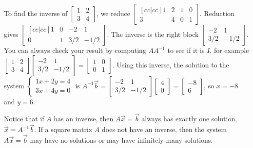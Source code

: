 \begin{example}\label{ex inverse}
To find the inverse of 
$\begin{bmatrix} 1&2\\3&4\end{bmatrix}$,
we reduce 
$\begin{bmatrix}[cc|cc] 1&2&1&0\\3&4&0&1\end{bmatrix}$.  
Reduction gives 
$\begin{bmatrix}[cc|cc] 1&0&-2&1\\0&1&3/2&-1/2
\end{bmatrix}$. 
The inverse is the right block  
$ \begin{bmatrix} -2&1\\3/2&-1/2
\end{bmatrix}$. 
%
You can always check your result by computing $AA^{-1}$ to see if it is $I$, for example
$\begin{bmatrix} 1&2\\ 3&4\end{bmatrix} \begin{bmatrix} -2&1\\3/2&-1/2\end{bmatrix} 
=  \begin{bmatrix} 1&0\\0&1
\end{bmatrix}$. 
Using this inverse, the solution to the system 
$\begin{cases}1x+2y=4\\3x+4y=0\end{cases}$ is $A^{-1}\vec b 
= \begin{bmatrix} -2&1\\3/2&-1/2\end{bmatrix}
\begin{bmatrix}4\\0\end{bmatrix} 
=  \begin{bmatrix}-8\\6\end{bmatrix}$, so $x=-8$ and $y=6$.
\end{example}

Notice that if $A$ has an inverse, then $A\vec x=\vec b$ always has exactly one solution, $\vec x=A^{-1}\vec b$.  If a square matrix $A$ does not have an inverse, then the system $A\vec x=\vec b$ may have no solutions or may have infinitely many solutions.

